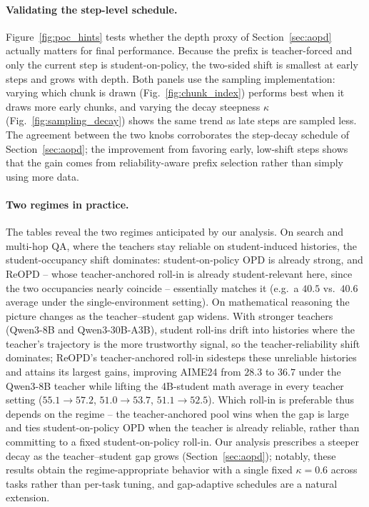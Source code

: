 \paragraph{Validating the step-level schedule.}
Figure~\ref{fig:poc_hints} tests whether the depth proxy of Section~\ref{sec:aopd}
actually matters for final performance. Because the prefix is teacher-forced and only the current step is
student-on-policy, the two-sided shift is smallest at early steps and grows with
depth. Both panels use the sampling implementation: varying which chunk is drawn
(Fig.~\ref{fig:chunk_index}) performs best when it draws more early chunks, and varying
the decay steepness \(\kappa\) (Fig.~\ref{fig:sampling_decay}) shows the same trend as
late steps are sampled less. The agreement between the two knobs corroborates the
step-decay schedule of Section~\ref{sec:aopd}; the improvement from favoring early,
low-shift steps shows that the gain comes from reliability-aware prefix selection
rather than simply using more data.

\paragraph{Two regimes in practice.}
The tables reveal the two regimes anticipated by our analysis. On search and
multi-hop QA, where the teachers stay reliable on student-induced histories, the
student-occupancy shift dominates: student-on-policy OPD is already strong, and
ReOPD -- whose teacher-anchored roll-in is already student-relevant here, since the two
occupancies nearly coincide -- essentially matches it (e.g.\ a $40.5$ vs.\ $40.6$
average under the single-environment setting). On mathematical reasoning the picture changes as
the teacher--student gap widens. With stronger teachers (Qwen3-8B and
Qwen3-30B-A3B), student roll-ins drift into histories where the teacher's trajectory
is the more trustworthy signal, so the teacher-reliability shift dominates; ReOPD's
teacher-anchored roll-in sidesteps these unreliable histories and attains its largest
gains, improving AIME24 from $28.3$ to $36.7$ under the Qwen3-8B teacher while
lifting the 4B-student math average in every teacher setting ($55.1\!\to\!57.2$,
$51.0\!\to\!53.7$, $51.1\!\to\!52.5$). Which roll-in is preferable thus depends on
the regime -- the teacher-anchored pool wins when the gap is large and ties
student-on-policy OPD when the teacher is already reliable, rather than committing to a
fixed student-on-policy roll-in. Our analysis prescribes a steeper decay as the
teacher--student gap grows (Section~\ref{sec:aopd}); notably, these results obtain the
regime-appropriate behavior with a single fixed \(\kappa\!=\!0.6\) across tasks rather
than per-task tuning, and gap-adaptive schedules are a natural extension.

